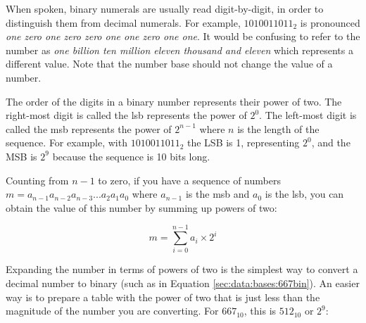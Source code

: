 When spoken, binary numerals are usually read digit-by-digit, in order to distinguish them from 
decimal numerals. For example, $1010011011_2$ is pronounced \textit{one zero one zero zero one 
one zero one one}. It would be confusing to refer to the number as \textit{one billion ten million 
eleven thousand and eleven} which represents a different value. Note that the number base should 
not change the value of a number.

The order of the digits in a binary number represents their power of two. The right-most digit is 
called the \gls{lsb} represents the power of $2^0$. The left-most digit is called 
the \gls{msb} represents the power of $2^{n-1}$ where $n$ is the length of the 
sequence. For example, with $1010011011_2$ the LSB is 1, representing $2^0$, and the MSB is $2^9$ 
because the sequence is 10 bits long. 

Counting from $n-1$ to zero, if you have a sequence of numbers $m = a_{n-1}a_{n-2}a_{n-3}...a_2a_1a_0$ 
where $a_{n-1}$ is the \gls{msb} and $a_0$ is the \gls{lsb}, you can obtain the value of this number 
by summing up powers of two:

\begin{equation}\label{eq:base2}
    m = \sum_{i=0}^{n-1} a_i \times 2^i
\end{equation}

\begin{figure}[h!]
\end{figure}

Expanding the number in terms of powers of two is the simplest way to convert a decimal number %
to binary (such as in Equation \ref{sec:data:bases:667bin}). An easier way is to prepare a table with the %
power of two that is just less than the magnitude of the number you are converting. For $667_{10}$, this is %
$512_{10}$ or $2^9$:

